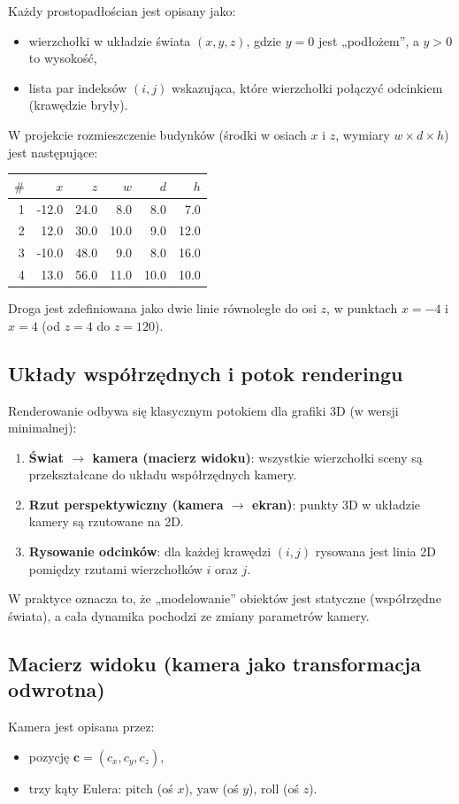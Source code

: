 \documentclass[12pt,a4paper]{article}
\begin{document}
Każdy prostopadłościan jest opisany jako:
\begin{itemize}
    \item wierzchołki w układzie świata $(x,y,z)$, gdzie $y=0$ jest „podłożem”, a $y>0$ to wysokość,
    \item lista par indeksów $(i,j)$ wskazująca, które wierzchołki połączyć odcinkiem (krawędzie bryły).
\end{itemize}

W projekcie rozmieszczenie budynków (środki w osiach $x$ i $z$, wymiary $w\times d\times h$) jest następujące:
\begin{center}
\begin{tabular}{@{}rrrrrr@{}}
\toprule
$\# $ & $x$ & $z$ & $w$ & $d$ & $h$ \\
\midrule
1 & -12.0 & 24.0 & 8.0 & 8.0 & 7.0 \\
2 &  12.0 & 30.0 & 10.0 & 9.0 & 12.0 \\
3 & -10.0 & 48.0 & 9.0 & 8.0 & 16.0 \\
4 &  13.0 & 56.0 & 11.0 & 10.0 & 10.0 \\
\bottomrule
\end{tabular}
\end{center}

Droga jest zdefiniowana jako dwie linie równoległe do osi $z$, w punktach $x=-4$ i $x=4$ (od $z=4$ do $z=120$).

\subsection{Układy współrzędnych i potok renderingu}
Renderowanie odbywa się klasycznym potokiem dla grafiki 3D (w wersji minimalnej):
\begin{enumerate}
    \item \textbf{Świat $\rightarrow$ kamera (macierz widoku)}: wszystkie wierzchołki sceny są przekształcane do układu współrzędnych kamery.
    \item \textbf{Rzut perspektywiczny (kamera $\rightarrow$ ekran)}: punkty 3D w układzie kamery są rzutowane na 2D.
    \item \textbf{Rysowanie odcinków}: dla każdej krawędzi $(i,j)$ rysowana jest linia 2D pomiędzy rzutami wierzchołków $i$ oraz $j$.
\end{enumerate}

W praktyce oznacza to, że „modelowanie” obiektów jest statyczne (współrzędne świata), a cała dynamika pochodzi ze zmiany parametrów kamery.

\subsection{Macierz widoku (kamera jako transformacja odwrotna)}
Kamera jest opisana przez:
\begin{itemize}
    \item pozycję $\mathbf{c}=(c_x,c_y,c_z)$,
    \item trzy kąty Eulera: $\text{pitch}$ (oś $x$), $\text{yaw}$ (oś $y$), $\text{roll}$ (oś $z$).
\end{itemize}
\end{document}
